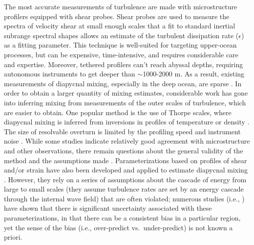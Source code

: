 \documentclass{ametsoc}
\begin{document}
The most accurate measurements of turbulence are made with microstructure profilers equipped with shear probes.  Shear probes are used to measure the spectra of velocity shear at small enough scales that a fit to standard inertial subrange spectral shapes allows an estimate of the turbulent dissipation rate ($\epsilon$) as a fitting parameter. This technique is well-suited for targeting upper-ocean processes, but can be expensive, time-intensive, and requires considerable care and expertise. Moreover, tethered profilers can't reach abyssal depths, requiring autonomous instruments to get deeper than $\sim$1000-2000 m.  As a result, existing measurements of diapycnal mixing, especially in the deep ocean, are sparse \citep{waterhouseetal14}. In order to obtain a larger quantity of mixing estimates, considerable work has gone into inferring mixing from measurements of the outer scales of turbulence, which are easier to obtain. One popular method is the use of Thorpe scales, where diapycnal mixing is inferred from inversions in profiles of temperature or density  \citep{thorpe77,dillon82}. The size of resolvable overturn is limited by the profiling speed and instrument noise \citep{galbraithkelley96}. 
While some studies indicate relatively good agreement with microstructure and other observations, there remain questions about the general validity of the method and the assumptions made \citep{materetal15,scotti15}. Parameterizations based on profiles of shear and/or strain have also been developed and applied to estimate diapycnal mixing \citep{gregg89a,kunzeetal06,polzinetal14,whalenetal12,whalenetal15}.  However, they rely on a series of assumptions about the cascade of energy from large to small scales (they assume turbulence rates are set by an energy cascade through the internal wave field) that are often violated; numerous studies (i.e., \cite{watermanetal13}) have shown that there is significant uncertainty associated with these parameterizations, in that there can be a consistent bias in a particular region, yet the sense of the bias (i.e., over-predict vs.\ under-predict) is not known a priori. 
\end{document}
